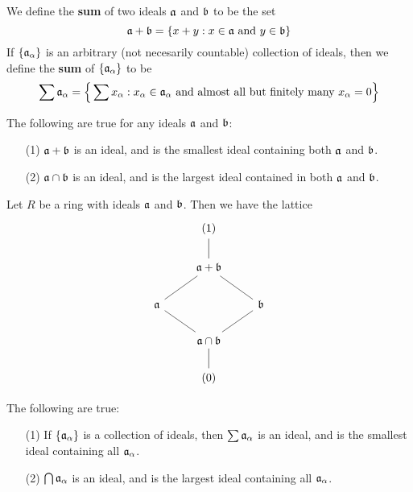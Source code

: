 \begin{definition}
  We define the \textbf{sum} of two ideals $\af$ and  $\bf$ to be the set
  \begin{equation*}
    \af+\bf=\{x+y : x \in \af \text{ and } y \in \bf\}
  \end{equation*}
  If $\{\af_\a\}$ is an arbitrary (not necesarily countable) collection of
  ideals, then we define the \textbf{sum} of $\{\af_\a\}$ to be
  \begin{equation*}
    \sum{\af_\a}=
    \Big{\{} \sum{x_\a} : x_\a \in \af_\a \text{ and almost all but finitely
    many } x_\a=0 \Big{\}}
  \end{equation*}
\end{definition}

\begin{proposition}\label{proposition_5.5.5}
  The following are true for any ideals $\af$ and $\bf$:
  \begin{enumerate}
    \item[(1)] $\af+\bf$ is an ideal, and is the smallest ideal containing both
      $\af$ and  $\bf$.

    \item[(2)] $\af \cap \bf$ is an ideal, and is the largest ideal
      contained in both $\af$ and $\bf$.
  \end{enumerate}
\end{proposition}
\begin{corollary}
  Let $R$ be a ring with ideals $\af$ and $\bf$. Then we have the lattice
  \[\begin{tikzcd}
  & (1) \\
  & {\af+\bf} \\
    \af && \bf \\
        & \af \cap \bf \\
        & {(0)}
        \arrow[no head, from=1-2, to=2-2]
        \arrow[no head, from=2-2, to=3-1]
        \arrow[no head, from=3-1, to=4-2]
        \arrow[no head, from=4-2, to=3-3]
        \arrow[no head, from=3-3, to=2-2]
        \arrow[no head, from=4-2, to=5-2]
  \end{tikzcd}\]
\end{corollary}
\begin{corollary}
  The following are true:
  \begin{enumerate}
    \item[(1)] If $\{\af_\a\}$ is a collection of ideals, then $\sum{\af_\a}$ is
      an ideal, and is the smallest ideal containing all $\af_\a$.

    \item[(2)] $\bigcap{\af_\a}$ is an ideal, and is the largest ideal
      containing all $\af_\a$.
  \end{enumerate}
\end{corollary}

